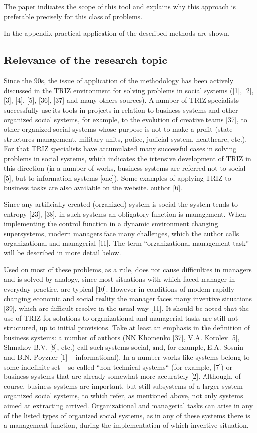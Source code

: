 The paper indicates the scope of this tool and explains why this approach is
preferable precisely for this class of problems.

In the appendix practical application of the described methods are shown.

\subsection{Relevance of the research topic}
Since the 90s, the issue of application of the methodology has been actively
discussed in the TRIZ environment for solving problems in social systems ([1],
[2], [3], [4], [5], [36], [37] and many others sources). A number of TRIZ
specialists successfully use its tools in projects in relation to business
systems and other organized social systems, for example, to the evolution of
creative teams [37], to other organized social systems whose purpose is not to
make a profit (state structures management, military units, police, judicial
system, healthcare, etc.). For that TRIZ specialists have accumulated many
successful cases in solving problems in social systems, which indicates the
intensive development of TRIZ in this direction (in a number of works,
business systems are referred not to social [5], but to information systems
[one]). Some examples of applying TRIZ to business tasks are also available on
the website.  author [6].

Since any artificially created (organized) system is social the system tends
to entropy [23], [38], in such systems an obligatory function is management.
When implementing the control function in a dynamic environment changing
supersystems, modern managers face many challenges, which the author calls
organizational and managerial [11]. The term “organizational management task”
will be described in more detail below.

Used on most of these problems, as a rule, does not cause difficulties in
managers and is solved by analogy, since most situations with which faced
manager in everyday practice, are typical [10]. However in conditions of
modern rapidly changing economic and social reality the manager faces many
inventive situations [39], which are difficult resolve in the usual way [11].
It should be noted that the use of TRIZ for solutions to organizational and
managerial tasks are still not structured, up to initial provisions. Take at
least an emphasis in the definition of business systems: a number of authors
(NN Khomenko [37], V.A. Korolev [5], Shmakov B.V. [8], etc.) call such systems
social, and, for example, E.A. Sosnin and B.N. Poyzner [1] -- informational).
In a number works like systems belong to some indefinite set -- so called
“non-technical systems“ (for example, [7]) or business systems that are
already somewhat more accurately [2]. Although, of course, business systems
are important, but still subsystems of a larger system -- organized social
systems, to which refer, as mentioned above, not only systems aimed at
extracting arrived. Organizational and managerial tasks can arise in any of
the listed types of organized social systems, as in any of these systems there
is a management function, during the implementation of which inventive
situation.

